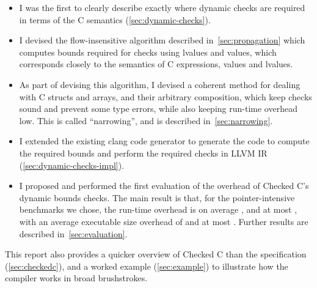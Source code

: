 \begin{itemize}

\item I was the first to clearly describe exactly where dynamic checks
are required in terms of the C semantics (\autoref{sec:dynamic-checks}).

\item I devised the flow-insensitive algorithm described
in~\autoref{sec:propagation} which computes bounds required for checks
using lvalues and values, which corresponds closely to the semantics
of C expressions, values and lvalues.

\item As part of devising this algorithm, I devised a coherent method
for dealing with C structs and arrays, and their arbitrary
composition, which keep checks sound and prevent some type errors,
while also keeping run-time overhead low. This is called
``narrowing'', and is described in~\autoref{sec:narrowing}.

\item I extended the existing clang code generator to generate the code to
compute the required bounds and perform the required checks in LLVM
IR (\autoref{sec:dynamic-checks-impl}).

\item I proposed and performed the first evaluation of the overhead of
Checked C's dynamic bounds checks. The main result is that, for the
pointer-intensive benchmarks we chose, the run-time overhead is on
average \ResultRunTimeMean, and at most \ResultRunTimeMax, with an
average executable size overhead of \ResultExecutableSizeMean and at
most \ResultExecutableSizeMax. Further results are described
in~\autoref{sec:evaluation}.


\end{itemize}

This report also provides a quicker overview of Checked C than the
specification (\autoref{sec:checkedc}), and a worked example
(\autoref{sec:example}) to illustrate how the compiler works in broad
brushstrokes.




